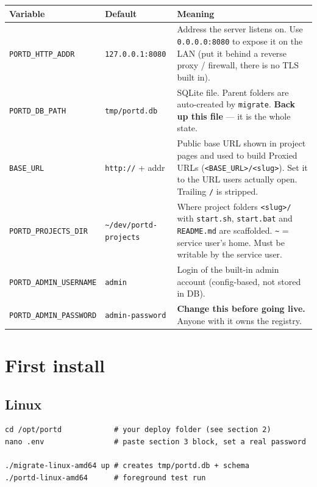 \documentclass[11pt,a4paper]{article}
\newcommand{\chemin}[1]{\texttt{#1}}
\begin{document}
\begin{center}
\begin{longtable}{p{3.8cm}p{3.5cm}p{7cm}}
  \hline
  \textbf{Variable} & \textbf{Default} & \textbf{Meaning} \\ \hline
  \chemin{PORTD\_HTTP\_ADDR} & \chemin{127.0.0.1:8080} & Address the server listens on. Use \chemin{0.0.0.0:8080} to expose it on the LAN (put it behind a reverse proxy / firewall, there is no TLS built in). \\ \hline
  \chemin{PORTD\_DB\_PATH} & \chemin{tmp/portd.db} & SQLite file. Parent folders are auto-created by \chemin{migrate}. \textbf{Back up this file} — it is the whole state. \\ \hline
  \chemin{BASE\_URL} & \chemin{http://} + addr & Public base URL shown in project pages and used to build Proxied URLs (\chemin{<BASE\_URL>/<slug>}). Set it to the URL users actually open. Trailing \chemin{/} is stripped. \\ \hline
  \chemin{PORTD\_PROJECTS\_DIR} & \chemin{\textasciitilde/dev/portd-projects} & Where project folders \chemin{<slug>/} with \chemin{start.sh}, \chemin{start.bat} and \chemin{README.md} are scaffolded. \chemin{\textasciitilde} = service user's home. Must be writable by the service user. \\ \hline
  \chemin{PORTD\_ADMIN\_USERNAME} & \chemin{admin} & Login of the built-in admin account (config-based, not stored in DB). \\ \hline
  \chemin{PORTD\_ADMIN\_PASSWORD} & \chemin{admin-password} & \textbf{Change this before going live.} Anyone with it owns the registry. \\ \hline
\end{longtable}
\end{center}

\section{First install}

\subsection{Linux}

\begin{verbatim}
cd /opt/portd            # your deploy folder (see section 2)
nano .env                # paste section 3 block, set a real password

./migrate-linux-amd64 up # creates tmp/portd.db + schema
./portd-linux-amd64      # foreground test run
\end{verbatim}
\end{document}
